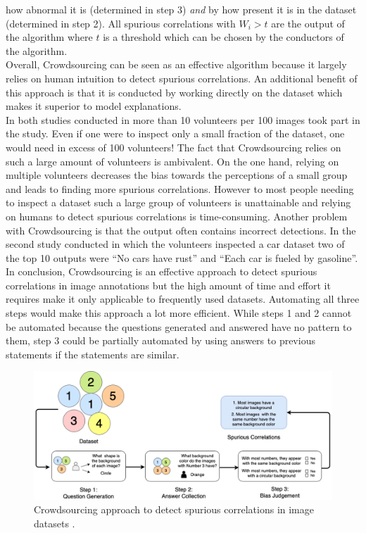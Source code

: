 \documentclass{article}
\begin{document}
how abnormal it is (determined in step 3) \textit{and} by how present it is in the dataset (determined in step 2).
All spurious correlations with $W_i > t$ are the output of the algorithm where $t$ is a threshold which can be chosen
by the conductors of the algorithm. \\
Overall, Crowdsourcing can be seen as an effective algorithm because it largely relies on human intuition to detect
spurious correlations. An additional benefit of this approach is that it is conducted by working directly
on the dataset which makes it superior to model explanations. \\
In both studies conducted in \cite{10.1145/3366423.3380063} more than 10 volunteers per 100 images took part in the study.
Even if one were to inspect only a small fraction of the dataset, one would need in excess of 100 volunteers!
The fact that Crowdsourcing relies on such a large amount of volunteers is ambivalent. On the one hand, relying on multiple
volunteers decreases the bias towards the perceptions of a small group and leads to finding more spurious correlations.
However to most people needing to inspect a dataset such a large group of volunteers is unattainable and relying on humans
to detect spurious correlations is time-consuming.
Another problem with Crowdsourcing is that the output often contains incorrect detections.
In the second study conducted in which the volunteers inspected a car dataset two of the top 10 outputs
were \enquote{No cars have rust} and \enquote{Each car is fueled by gasoline}. \\
In conclusion, Crowdsourcing is an effective approach to detect spurious correlations in image annotations
but the high amount of time and effort it requires make it only applicable to frequently used datasets. 
Automating all three steps would make this approach a lot more efficient. While steps 1 and 2 cannot be automated because the
questions generated and answered have no pattern to them, step 3 could be partially automated by using answers to previous
statements if the statements are similar.

\begin{figure}[!h]
    \centering
    \includegraphics[scale=0.315]{crowdsourcing.png}
    \caption{Crowdsourcing approach to detect spurious correlations in image datasets \cite{10.1145/3366423.3380063}.}
    \label{fig:crowdsourcing}
\end{figure}
\end{document}
